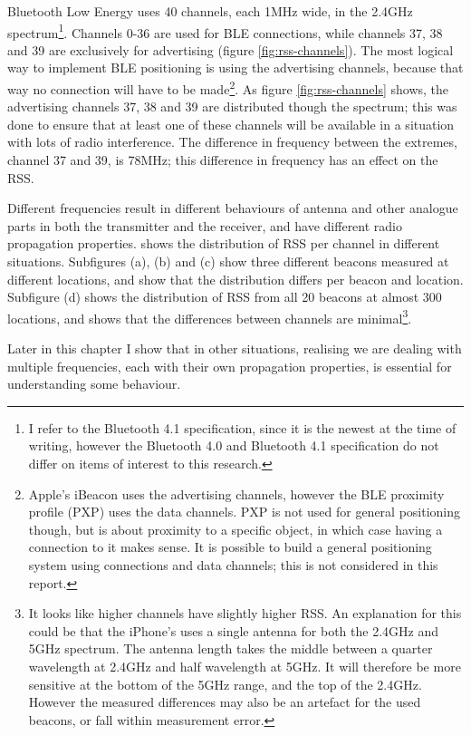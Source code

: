 Bluetooth Low Energy uses 40 channels, each 1MHz wide, in the 2.4GHz spectrum\citep{bluetooth41spec}\footnote{I refer to the Bluetooth 4.1 specification, since it is the newest at the time of writing, however the Bluetooth 4.0 and Bluetooth 4.1 specification do not differ on items of interest to this research.}.
Channels 0-36 are used for BLE connections, while channels 37, 38 and 39 are exclusively for advertising (figure \ref{fig:rss-channels}).
The most logical way to implement BLE positioning is using the advertising channels, because that way no connection will have to be made\footnote{Apple's iBeacon uses the advertising channels, however the BLE proximity profile (PXP) uses the data channels. PXP is not used for general positioning though, but is about proximity to a specific object, in which case having a connection to it makes sense. It is possible to build a general positioning system using connections and data channels; this is not considered in this report.}.
As figure \ref{fig:rss-channels} shows, the advertising channels 37, 38 and 39 are distributed though the spectrum; this was done to ensure that at least one of these channels will be available in a situation with lots of radio interference.
The difference in frequency between the extremes, channel 37 and 39, is 78MHz; this difference in frequency has an effect on the RSS.

Different frequencies result in different behaviours of antenna and other analogue parts in both the transmitter and the receiver, and have different radio propagation properties.
 shows the distribution of RSS per channel in different situations.
Subfigures (a), (b) and (c) show three different beacons measured at different locations, and show that the distribution differs per beacon and location.
Subfigure (d) shows the distribution of RSS from all 20 beacons at almost 300 locations, and shows that the differences between channels are minimal\footnote{It looks like higher channels have slightly higher RSS.
    An explanation for this could be that the iPhone's uses a single antenna for both the 2.4GHz and 5GHz spectrum.
    The antenna length takes the middle between a quarter wavelength at 2.4GHz and half wavelength at 5GHz.
    It will therefore be more sensitive at the bottom of the 5GHz range, and the top of the 2.4GHz.
    However the measured differences may also be an artefact for the used beacons, or fall within measurement error.
}.

Later in this chapter I show that in other situations, realising we are dealing with multiple frequencies, each with their own propagation properties, is essential for understanding some behaviour.

